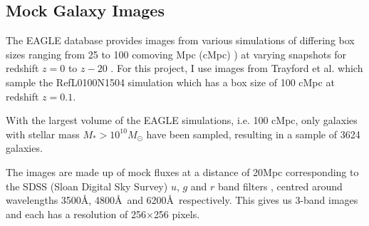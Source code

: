 \documentclass[12pt, onecolumn]{article}
\begin{document}

        
        

        

        
        
    
    \subsection{Mock Galaxy Images}

        The EAGLE database provides images from various simulations of differing box sizes ranging from 25 to 100 comoving Mpc (cMpc) \cite{eagle_catalogue_public_release}) at varying snapshots for redshift $z=0$ to $z-20$ \cite{eagle_catalogue_public_release}. For this project, I use images from Trayford et al. \cite{trayford} which sample the RefL0100N1504 simulation which has a box size of 100 cMpc at redshift $z=0.1$.

        With the largest volume of the EAGLE simulations, i.e. 100 cMpc, only galaxies with stellar mass $M_{*} > 10^{10} M_{\odot}$ have been sampled, resulting in a sample of 3624 galaxies.
        
        The images are made up of mock fluxes at a distance of 20Mpc corresponding to the SDSS (Sloan Digital Sky Survey) $u$, $g$ and $r$ band filters \cite{how_images_taken}, centred around wavelengths 3500\AA, 4800\AA\ and 6200\AA\ respectively. This gives us 3-band images and each has a resolution of 256$\times$256 pixels.
\end{document}
